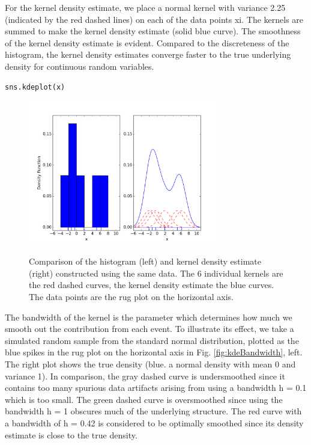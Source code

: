 For the kernel density estimate, we place a normal kernel with variance 2.25 (indicated by the red dashed lines) on each of the data points xi. The kernels are summed to make the kernel density estimate (solid blue curve). The smoothness of the kernel density estimate is evident. Compared to the discreteness of the histogram, the kernel density estimates converge faster to the true underlying density for continuous random variables.

\begin{lstlisting}[language=Python]
  sns.kdeplot(x)
\end{lstlisting}
\begin{figure}[H]
  \centering
  \includegraphics[width=0.75\textwidth]{../Images/KDEexplained.png}\\
  \caption{Comparison of the histogram (left) and kernel density estimate (right) constructed using the same data. The 6 individual kernels are the red dashed curves, the kernel density estimate the blue curves. The data points are the rug plot on the horizontal axis.}
\end{figure}


The bandwidth of the kernel is the parameter which determines how much we smooth out the contribution from each event. To illustrate its effect, we take a simulated random sample from the standard normal distribution, plotted as the blue spikes in the rug plot on the horizontal axis in Fig. \ref{fig:kdeBandwidth}, left. The right plot shows the true density (blue. a normal density with mean 0 and variance 1). In comparison, the gray dashed curve is undersmoothed since it contains too many spurious data artifacts arising from using a bandwidth h = 0.1 which is too small. The green dashed curve is oversmoothed since using the bandwidth h = 1 obscures much of the underlying structure. The red curve with a bandwidth of h = 0.42 is considered to be optimally smoothed since its density estimate is close to the true density.

